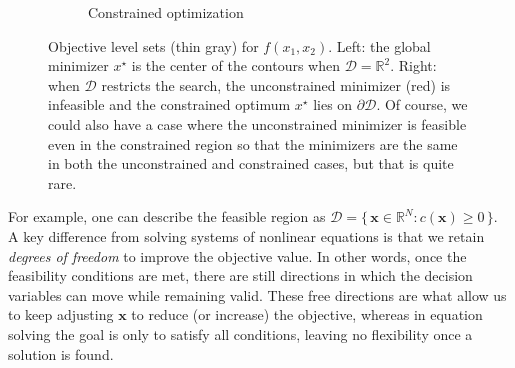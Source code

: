 \begin{figure}[H]
\begin{subfigure}{0.48\textwidth}
    \caption{Constrained optimization}
    \end{subfigure}
    
    \caption{Objective level sets (thin gray) for $f(x_1,x_2)$. Left: the global minimizer $x^\star$ is the center of the contours when $\mathcal{D}=\mathbb{R}^2$. Right: when $\mathcal{D}$ restricts the search, the unconstrained minimizer (red) is infeasible and the constrained optimum $x^\star$ lies on $\partial \mathcal{D}$. Of course, we could also have a case where the unconstrained minimizer is feasible even in the constrained region so that the minimizers are the same in both the unconstrained and constrained cases, but that is quite rare.}
    \label{fig:unconstrained-vs-constrained}
\end{figure}

For example, one can describe the feasible region as $\mathcal{D} = \{\, \mathbf{x} \in \mathbb{R}^N : c(\mathbf{x}) \ge 0 \,\}$. A key difference from solving systems of nonlinear equations is that we retain \emph{degrees of freedom} to improve the objective value. In other words, once the feasibility conditions are met, there are still directions in which the decision variables can move while remaining valid. These free directions are what allow us to keep adjusting $\mathbf{x}$ to reduce (or increase) the objective, whereas in equation solving the goal is only to satisfy all conditions, leaving no flexibility once a solution is found.

